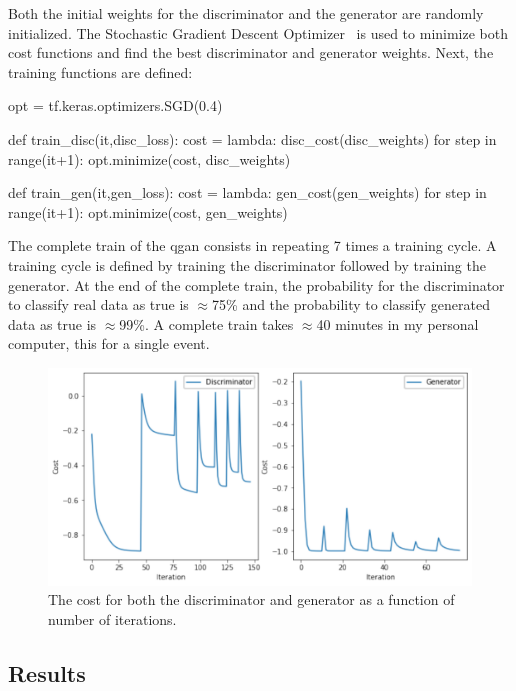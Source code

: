 Both the initial weights for the discriminator and the generator are randomly
initialized. 
The Stochastic Gradient Descent Optimizer~\cite{SGC} is used to minimize both 
cost functions and find the best discriminator and generator weights. Next,
the training functions are defined:
\begin{python}
opt = tf.keras.optimizers.SGD(0.4)

def train_disc(it,disc_loss):
    cost = lambda: disc_cost(disc_weights)
    for step in range(it+1):
        opt.minimize(cost, disc_weights) 

def train_gen(it,gen_loss):
    cost = lambda: gen_cost(gen_weights)
    for step in range(it+1):
        opt.minimize(cost, gen_weights)
\end{python}

The complete train of the \gls{qgan} consists in repeating 7 times a training 
cycle. A training cycle is defined by training the discriminator followed by 
training the generator.
At the end of the complete train, the probability for the discriminator to 
classify real data as true is $\approx$75\% and the probability to classify 
generated data as true is $\approx$99\%. A complete train takes $\approx$40 
minutes in my personal computer, this for a single event.

\begin{figure}[!htbp]
\centering
    \includegraphics[width=1\textwidth]{figures/costs.pdf}
\caption{The cost for both the discriminator and generator as a function of 
        number of iterations.}
\label{fig:costs}
\end{figure}

\subsection{Results}
\label{sec:res}

